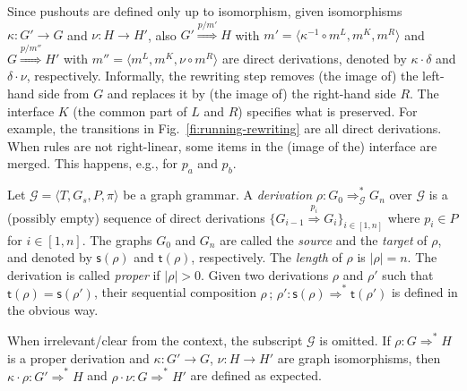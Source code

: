 \documentclass[conference]{IEEEtran}
\newcommand{\Rrel}[1]   {\stackrel{{#1}}{\Longrightarrow}}
\newcommand{\interval}[2][1]{\ensuremath{[{#1},{#2}]}}
\newcommand{\source}[1]{\ensuremath{\mathsf{s}({#1})}}
\newcommand{\target}[1]{\ensuremath{\mathsf{t}({#1})}}
\begin{document}
% 
Since pushouts are defined only up to isomorphism, given isomorphisms
$\kappa : G' \to G$ and $\nu : H \to H'$, also $G' \Rrel{p/m'} H$
with $m' = \langle \kappa^{-1} \circ m^L, m^K, m^R \rangle$ and
$G \Rrel{p/m''} H'$ with $m'' = \langle  m^L, m^K, \nu \circ m^R \rangle$  are direct derivations, 
denoted by $\kappa \cdot \delta$ and $\delta \cdot \nu$, respectively.
%
Informally, the rewriting step removes (the image
of) the left-hand side from $G$ and replaces it by (the
image of) the right-hand side $R$. The interface $K$ (the common part 
of $L$ and $R$) specifies what is preserved.
%
For example, the transitions in Fig.~\ref{fi:running-rewriting} are
all direct derivations.
%
When rules are not right-linear, some items in the (image of the) interface are merged. This happens, e.g., for  $p_a$ and $p_b$.


\begin{definition}[derivations]
  \label{de:derivations}
  Let $\mathcal{G} = \langle T, G_s, P, \pi \rangle$ be a graph
  grammar. A \emph{derivation}
  $\rho: G_0 \Rrel{}^{*}_{\mathcal{G}} G_n$ over ${\mathcal{G}}$ is a
  (possibly empty) sequence of direct derivations
  $\{G_{i-1} \Rrel{p_{i}} G_i\}_{i \in \interval{n}}$ where
  $p_i \in P$ for $i \in \interval{n}$.  The graphs $G_0$ and $G_n$
  are called the \emph{source} and the \emph{target} of $\rho$, and
  denoted by $\source{\rho}$ and $\target{\rho}$, respectively. The
  \emph{length} of $\rho$ is $|\rho| = n$.
  The derivation is called {\em
    proper} if $|\rho| > 0$.
  Given two derivations $\rho$
  and $\rho'$ such that $\target{\rho} = \source{\rho'}$, their
  sequential composition
  $\rho\,;\,\rho': \source{\rho} \Rrel{}^{*} \target{\rho'}$ is
  defined in the obvious way.
\end{definition}

When irrelevant/clear from the context, the subscript
$\mathcal{G}$ is omitted.  
If
$\rho : G \Rrel{}^{*} H$ is a proper derivation 
and
$\kappa : G' \to G$, $\nu : H \to H'$ are graph isomorphisms, then
$\kappa \cdot \rho : G' \Rrel{}^{*} H$ and
$\rho \cdot \nu : G \Rrel{}^{*} H'$ are defined as expected.
\end{document}
